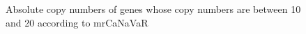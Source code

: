 \begin{figure}
    \centering
    \quad
    \caption{Absolute copy numbers of genes whose copy numbers are between 10 and 20 according to mrCaNaVaR}
    \label{btw2030}
\end{figure}



